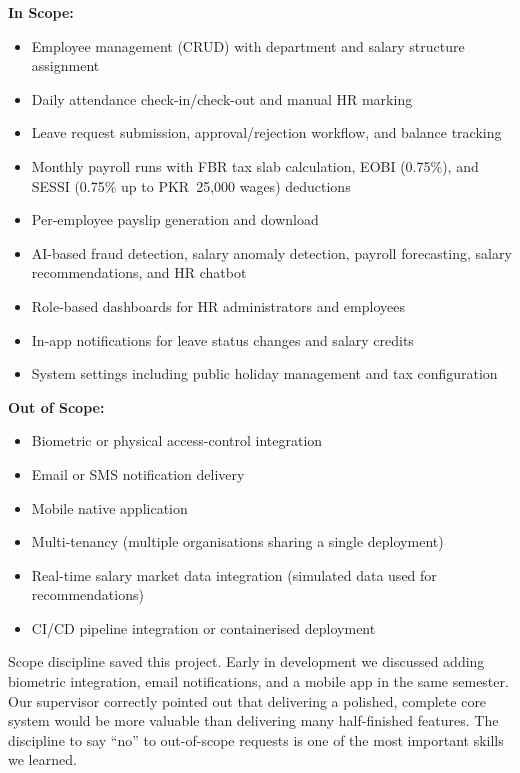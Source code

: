 \documentclass[12pt,a4paper]{report}
\begin{document}
\textbf{In Scope:}
\begin{itemize}
    \item Employee management (CRUD) with department and salary structure assignment
    \item Daily attendance check-in/check-out and manual HR marking
    \item Leave request submission, approval/rejection workflow, and balance tracking
    \item Monthly payroll runs with FBR tax slab calculation, EOBI (0.75\%), and SESSI (0.75\% up to PKR~25,000 wages) deductions
    \item Per-employee payslip generation and download
    \item AI-based fraud detection, salary anomaly detection, payroll forecasting, salary recommendations, and HR chatbot
    \item Role-based dashboards for HR administrators and employees
    \item In-app notifications for leave status changes and salary credits
    \item System settings including public holiday management and tax configuration
\end{itemize}

\textbf{Out of Scope:}
\begin{itemize}
    \item Biometric or physical access-control integration
    \item Email or SMS notification delivery
    \item Mobile native application
    \item Multi-tenancy (multiple organisations sharing a single deployment)
    \item Real-time salary market data integration (simulated data used for recommendations)
    \item CI/CD pipeline integration or containerised deployment
\end{itemize}

\begin{lessonbox}
Scope discipline saved this project. Early in development we discussed adding biometric integration, email notifications, and a mobile app in the same semester. Our supervisor correctly pointed out that delivering a polished, complete core system would be more valuable than delivering many half-finished features. The discipline to say ``no'' to out-of-scope requests is one of the most important skills we learned.
\end{lessonbox}
\end{document}
